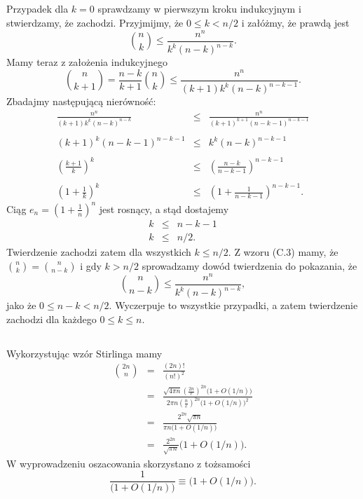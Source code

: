 \subsection{} %
Przypadek dla $k=0$ sprawdzamy w pierwszym kroku indukcyjnym i stwierdzamy, że zachodzi. Przyjmijmy, że $0\le k<n/2$ i załóżmy, że prawdą jest
\[
	\binom{n}{k} \le \frac{n^n}{k^k(n-k)^{n-k}}.
\]
Mamy teraz z założenia indukcyjnego
\[
	\binom{n}{k+1} = \frac{n-k}{k+1}\binom{n}{k} \le \frac{n^n}{(k+1)k^k(n-k)^{n-k-1}}.
\]
Zbadajmy następującą nierówność:
\begin{eqnarray*}
	\frac{n^n}{(k+1)k^k(n-k)^{n-k}} &\le& \frac{n^n}{(k+1)^{k+1}(n-k-1)^{n-k-1}} \\\\
	(k+1)^k(n-k-1)^{n-k-1} &\le& k^k(n-k)^{n-k-1} \\\\
	\left(\frac{k+1}{k}\right)^k &\le& \left(\frac{n-k}{n-k-1}\right)^{n-k-1} \\\\
	\left(1+\frac{1}{k}\right)^k &\le& \left(1+\frac{1}{n-k-1}\right)^{n-k-1}.
\end{eqnarray*}
Ciąg $e_n=\left(1+\frac{1}{n}\right)^n$ jest rosnący, a stąd dostajemy
\begin{eqnarray*}
	k &\le& n-k-1 \\
	k &\le& n/2.
\end{eqnarray*}
Twierdzenie zachodzi zatem dla wszystkich $k\le n/2$. Z wzoru (C.3) mamy, że $\binom{n}{k}=\binom{n}{n-k}$ i gdy $k>n/2$ sprowadzamy dowód twierdzenia do pokazania, że
\[
	\binom{n}{n-k} \le \frac{n^n}{k^k(n-k)^{n-k}},
\]
jako że $0\le n-k<n/2$. Wyczerpuje to wszystkie przypadki, a zatem twierdzenie zachodzi dla każdego $0\le k\le n$.

\subsection{} %
Wykorzystując wzór Stirlinga mamy
\begin{eqnarray*}
	\binom{2n}{n} &=& \frac{(2n)!}{(n!)^2} \\
	&=& \frac{\sqrt{4\pi n}\left(\frac{2n}{e}\right)^{2n}\bigl(1+O(1/n)\bigr)}{2\pi n\left(\frac{n}{e}\right)^{2n}\bigl(1+O(1/n)\bigr)^2} \\
	&=& \frac{2^{2n}\sqrt{\pi n}}{\pi n\bigl(1+O(1/n)\bigr)} \\
	&=& \frac{2^{2n}}{\sqrt{\pi n}}\bigl(1+O(1/n)\bigr).
\end{eqnarray*}
W wyprowadzeniu oszacowania skorzystano z tożsamości
\[
	\frac{1}{\bigl(1+O(1/n)\bigr)} \equiv \bigl(1+O(1/n)\bigr).
\]

